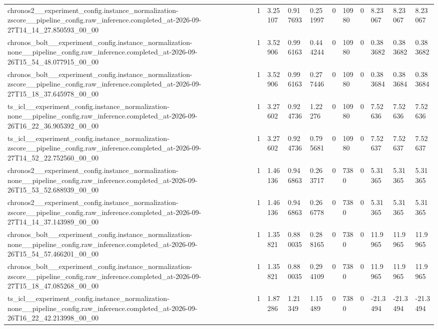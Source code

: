 \begin{tabular}{lllllllllll}
chronos2\_\_experiment\_config.instance\_normalization-zscore\_\_pipeline\_config.raw\_inference.completed\_at-2026-09-27T14\_14\_27.850593\_00\_00 & 1 & 3.25107 & 0.917693 & 0.251997 & 0 & 10980 & 0 & 8.23067 & 8.23067 & 8.23067 \\
chronos\_bolt\_\_experiment\_config.instance\_normalization-none\_\_pipeline\_config.raw\_inference.completed\_at-2026-09-26T15\_54\_48.077915\_00\_00 & 1 & 3.52906 & 0.996163 & 0.444244 & 0 & 10980 & 0 & 0.383682 & 0.383682 & 0.383682 \\
chronos\_bolt\_\_experiment\_config.instance\_normalization-zscore\_\_pipeline\_config.raw\_inference.completed\_at-2026-09-27T15\_18\_37.645978\_00\_00 & 1 & 3.52906 & 0.996163 & 0.277446 & 0 & 10980 & 0 & 0.383684 & 0.383684 & 0.383684 \\
ts\_icl\_\_experiment\_config.instance\_normalization-none\_\_pipeline\_config.raw\_inference.completed\_at-2026-09-26T16\_22\_36.905392\_00\_00 & 1 & 3.27602 & 0.924736 & 1.22276 & 0 & 10980 & 0 & 7.52636 & 7.52636 & 7.52636 \\
ts\_icl\_\_experiment\_config.instance\_normalization-zscore\_\_pipeline\_config.raw\_inference.completed\_at-2026-09-27T14\_52\_22.752560\_00\_00 & 1 & 3.27602 & 0.924736 & 0.795681 & 0 & 10980 & 0 & 7.52637 & 7.52637 & 7.52637 \\
chronos2\_\_experiment\_config.instance\_normalization-none\_\_pipeline\_config.raw\_inference.completed\_at-2026-09-26T15\_53\_52.688939\_00\_00 & 1 & 1.46136 & 0.946863 & 0.263717 & 0 & 7380 & 0 & 5.31365 & 5.31365 & 5.31365 \\
chronos2\_\_experiment\_config.instance\_normalization-zscore\_\_pipeline\_config.raw\_inference.completed\_at-2026-09-27T14\_14\_37.143989\_00\_00 & 1 & 1.46136 & 0.946863 & 0.266778 & 0 & 7380 & 0 & 5.31365 & 5.31365 & 5.31365 \\
chronos\_bolt\_\_experiment\_config.instance\_normalization-none\_\_pipeline\_config.raw\_inference.completed\_at-2026-09-26T15\_54\_57.466201\_00\_00 & 1 & 1.35821 & 0.880035 & 0.288165 & 0 & 7380 & 0 & 11.9965 & 11.9965 & 11.9965 \\
chronos\_bolt\_\_experiment\_config.instance\_normalization-zscore\_\_pipeline\_config.raw\_inference.completed\_at-2026-09-27T15\_18\_47.085268\_00\_00 & 1 & 1.35821 & 0.880035 & 0.294109 & 0 & 7380 & 0 & 11.9965 & 11.9965 & 11.9965 \\
ts\_icl\_\_experiment\_config.instance\_normalization-none\_\_pipeline\_config.raw\_inference.completed\_at-2026-09-26T16\_22\_42.213998\_00\_00 & 1 & 1.87286 & 1.21349 & 1.15489 & 0 & 7380 & 0 & -21.3494 & -21.3494 & -21.3494 \\

\end{tabular}
